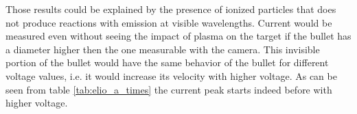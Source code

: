 Those results could be explained by the presence of ionized particles that does not produce reactions with emission at visible wavelengths. Current would be measured even without seeing the impact of plasma on the target if the bullet has a diameter higher then the one measurable with the camera. This invisible portion of the bullet would have the same behavior of the bullet for different voltage values, i.e. it would increase its velocity with higher voltage. As can be seen from table \ref{tab:elio_a_times} the current peak starts indeed before with higher voltage.


